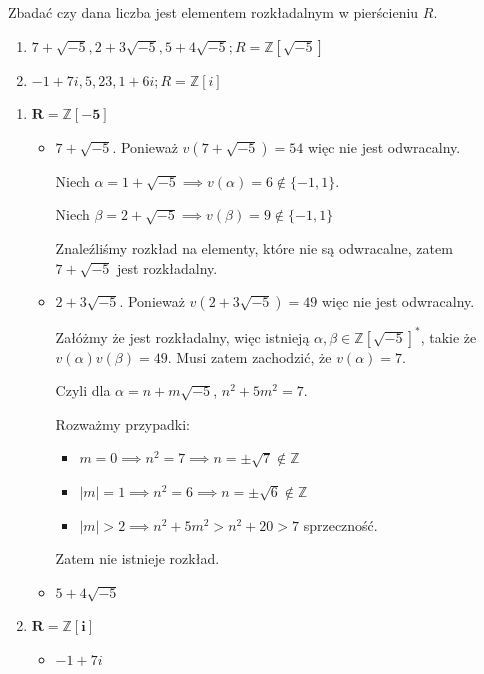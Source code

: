 \begin{problem}[6]
	Zbadać czy dana liczba jest elementem rozkładalnym w pierścieniu $R$.
	 \begin{enumerate}[label=\alph*)]
		\item $7 + \sqrt{-5}, 2 + 3\sqrt{-5}, 5+4\sqrt{-5}; R = \mathbb{Z} \left[ \sqrt{-5}\right]$ 
		\item $-1 + 7i, 5, 23, 1+6i; R = \mathbb{Z} \left[i\right] $
	\end{enumerate}
\end{problem} 
\begin{solution}
	\begin{enumerate}[label=\alph*)]
		\item $\bm{ R = \mathbb{Z} \left[ -5 \right] }$ 
			\begin{itemize}
				 \item $7 + \sqrt{-5}$. Ponieważ $v\left( 7 + \sqrt{-5}  \right) = 54$ więc nie jest odwracalny.

					 Niech $\alpha = 1 + \sqrt{-5}  \implies v\left( \alpha  \right) = 6 \not\in \{-1,1\} $.

					 Niech $\beta = 2 + \sqrt{-5} \implies v\left( \beta  \right) = 9 \not\in \{-1,1\} $

					 Znaleźliśmy rozkład na elementy, które nie są odwracalne, zatem $7 + \sqrt{-5} $ jest rozkładalny.
				 \item $2 + 3\sqrt{-5}$. Ponieważ $v\left( 2 +3 \sqrt{-5}  \right) = 49$ więc nie jest odwracalny.

					 Załóżmy że jest rozkładalny, więc istnieją $\alpha, \beta \in \mathbb{Z} \left[ \sqrt{-5}  \right] ^{\ast} $, takie że $v\left( \alpha  \right) v\left( \beta  \right) = 49.$ Musi zatem zachodzić, że $v\left( \alpha  \right) = 7$.

					 Czyli dla $\alpha = n + m\sqrt{-5} $, $n^2 + 5m^2 = 7$.
					 
					 Rozważmy przypadki:
					 \begin{itemize}
					 	\item $m=0 \implies n^2 = 7 \implies n = \pm \sqrt{7} \not\in \mathbb{Z} $
						\item $\left| m \right| = 1 \implies n^2 = 6 \implies n = \pm \sqrt{6}  \not\in \mathbb{Z} $
						\item $\left| m \right| > 2 \implies n^2 + 5m^2 > n^2 + 20 > 7$ sprzeczność.
					 \end{itemize}

					 Zatem nie istnieje rozkład.
				 \item $5+4\sqrt{-5}$ 
			\end{itemize}
		\item $\bm{ R = \mathbb{Z} \left[ i \right]  } $ 
			\begin{itemize}
				\item $-1 + 7i$


\end{itemize}
\end{enumerate}
\end{solution}
